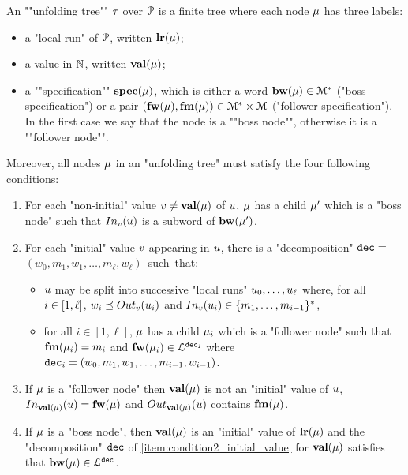 \AP An ""unfolding tree"" $\tau$ over $\mathcal{P}$ is
a finite tree where each node $\mu$ has three labels:
\begin{itemize}
	\item a "local run" of $\mathcal{P}$, written $\mathbf{lr}(\mu)$;
	
	\item a value in $\mathbb{N}$, written $\mathbf{val}(\mu)$;
	
	\item a ""specification"" $\mathbf{spec}(\mu)$, which is either a word $\mathbf{bw}(\mu) \in \mathcal{M}^*$ ("boss specification") or a pair $(\mathbf{fw}(\mu), \mathbf{fm}(\mu)) \in \mathcal{M}^* \times \mathcal{M}$ ("follower specification"). In the first case we say that the node is a ""boss node"", otherwise it is a ""follower node"".
\end{itemize} 
Moreover, all nodes $\mu$ in an "unfolding tree" must satisfy the four following conditions:
\begin{enumerate}[label= (\roman*), ref=(\roman*)]
	\item \label{item:condition1_non_initial_value} For each "non-initial" value $v \ne \mathbf{val}(\mu)$ of $u$, $\mu$ has a child $\mu'$ which is a "boss node" such that $\vinput{\aval}{\localrun}$ is a subword of $\mathbf{bw}(\mu')$.
	
	\item \label{item:condition2_initial_value} For each "initial" value $v$ appearing in $u$, there is a "decomposition" $\mathtt{dec} =$ \\ $(w_0, m_1, w_1, \ldots, m_{\ell}, w_{\ell})$~such~that:
	\begin{itemize}
		\item $u$ may be split into successive "local runs" $u_0, \dots, u_{\ell}$ where, for all $i \in [1,\ell]$, $w_i \subword \voutput{\aval}{\localrun_i}$ and $\vinput{\aval}{\localrun_i} \in \set{m_1, \dots, m_{i-1}}^*$,
		\item for all $i \in [1,\ell]$, $\mu$ has a child $\mu_i$ which is a "follower node" such that $\mathbf{fm}(\mu_i) = m_i$ and $\mathbf{fw}(\mu_i) \in\mathcal{L}^{\mathtt{\mathtt{dec}_i}}$ where $\mathtt{dec}_i = (w_0, m_1, w_1, \ldots, m_{i-1}, w_{i-1})$.	\end{itemize}
	
	\item \label{item:condition3_follower_node} If $\mu$ is a "follower node" then $\mathbf{val}(\mu)$ is not an "initial" value of $u$, $\vinput{\valuelabel{\node}}{\localrun} = \followlabelword{\node}$ and 
	$\voutput{\valuelabel{\node}}{\localrun}$ contains $\mathbf{fm}(\mu)$.

	\item \label{item:condition4_boss_node} If $\mu$ is a "boss node", then $\mathbf{val}(\mu)$ is an "initial" value of $\mathbf{lr}(\mu)$ and the "decomposition" $\mathtt{dec}$ of \ref{item:condition2_initial_value} for $\mathbf{val}(\mu)$ satisfies that $\mathbf{bw}(\mu) \in \mathcal{L}^{\mathtt{\mathtt{dec}}}$.
\end{enumerate}

